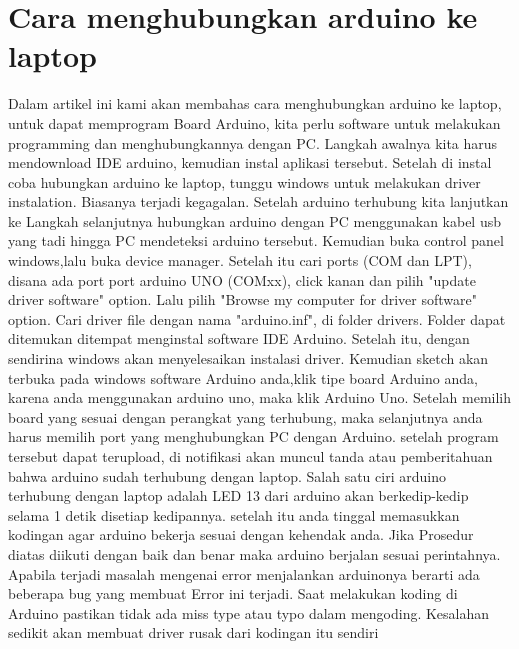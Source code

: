 \section{Cara menghubungkan arduino ke laptop}
Dalam artikel ini kami akan membahas cara menghubungkan arduino ke laptop, untuk dapat memprogram Board Arduino, kita perlu software untuk melakukan programming dan menghubungkannya dengan PC. Langkah awalnya kita harus mendownload IDE arduino, kemudian instal aplikasi tersebut. Setelah di instal coba hubungkan arduino ke laptop, tunggu windows untuk melakukan driver instalation. Biasanya terjadi kegagalan.
Setelah arduino terhubung kita lanjutkan ke Langkah selanjutnya hubungkan arduino dengan PC menggunakan kabel usb yang tadi hingga PC mendeteksi arduino tersebut. Kemudian buka control panel windows,lalu buka device manager. Setelah itu cari ports (COM dan LPT), disana ada port port arduino UNO (COMxx), click kanan dan pilih "update driver software" option.
Lalu pilih "Browse my computer for driver software" option. Cari driver file dengan nama "arduino.inf", di folder drivers. Folder dapat ditemukan ditempat menginstal software IDE Arduino.
Setelah itu, dengan sendirina windows akan menyelesaikan instalasi driver. Kemudian sketch akan terbuka pada windows software Arduino anda,klik tipe board Arduino anda, karena anda menggunakan arduino uno, maka klik Arduino Uno.
Setelah memilih board yang sesuai dengan perangkat yang terhubung, maka selanjutnya anda harus memilih port yang menghubungkan PC dengan Arduino.
setelah program tersebut dapat terupload, di notifikasi akan muncul tanda atau pemberitahuan bahwa arduino sudah terhubung dengan laptop. Salah satu ciri arduino terhubung dengan laptop adalah LED 13 dari arduino akan berkedip-kedip selama 1 detik disetiap kedipannya.
setelah itu anda tinggal memasukkan kodingan agar arduino bekerja sesuai dengan kehendak anda.
Jika Prosedur diatas diikuti dengan baik dan benar maka arduino berjalan sesuai perintahnya.
Apabila terjadi masalah mengenai error menjalankan arduinonya berarti ada beberapa bug yang membuat Error ini terjadi.
Saat melakukan koding di Arduino pastikan tidak ada miss type atau typo dalam mengoding. Kesalahan sedikit akan membuat driver rusak dari kodingan itu sendiri

